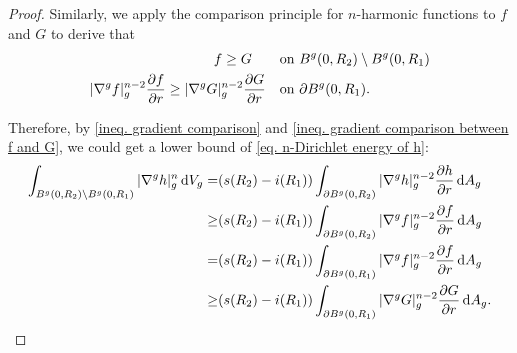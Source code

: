 \documentclass[12pt]{amsart}
\theoremstyle{plain}
\theoremstyle{definition}
\theoremstyle{remark}     %
\numberwithin{equation}{section}
\newcommand{\dd}{\mathop{}\!\mathrm{d}}%
\newcommand{\nablag}{\nabla^g} %
\begin{document}
\begin{proof}
    Similarly, we apply the comparison principle for $n$-harmonic functions to $f$ and $G$ to derive that
    \begin{align}
        f\geq G \quad\quad\text{on }& B^g(0,R_2)\setminus B^g(0,R_1)\notag\\
        |\nablag f|_g^{n-2}\frac{\partial f}{\partial r}
        \geq  
        |\nablag G|_g^{n-2}\frac{\partial G}{\partial r} 
        \quad\text{on }& \partial B^g(0,R_1).\label{ineq. gradient comparison between f and G}
    \end{align}

    Therefore, by \cref{ineq. gradient comparison} and \cref{ineq. gradient comparison between f and G}, we could get a lower bound of \cref{eq. n-Dirichlet energy of h}:
    \begin{align}
        \int_{B^g(0,R_2)\setminus B^g(0,R_1)}|\nabla^g h|_g^n\dd V_g
        =&(s(R_2)-i(R_1))\int_{\partial B^g(0,R_2)} |\nablag h|_g^{n-2}\frac{\partial h}{\partial r}\dd A_g \notag\\
        \geq &(s(R_2)-i(R_1))\int_{\partial B^g(0,R_2)} |\nablag f|_g^{n-2}\frac{\partial f}{\partial r}\dd A_g\notag\\
        =&(s(R_2)-i(R_1))\int_{\partial B^g(0,R_1)} |\nablag f|_g^{n-2}\frac{\partial f}{\partial r}\dd A_g\notag\\
        \geq & (s(R_2)-i(R_1))\int_{\partial B^g(0,R_1)} |\nablag G|_g^{n-2}\frac{\partial G}{\partial r}
        \dd A_g.
        \label{ineq. lower bound of n-Dirichlet energy of h}
    \end{align}


\end{proof}
\end{document}
